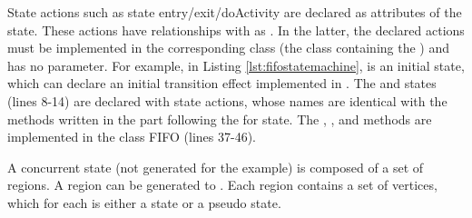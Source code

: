 State actions such as state entry/exit/doActivity are declared as attributes of the state.
These actions have relationships with  as .
In the latter, the declared actions must be implemented in the corresponding class (the class containing the ) and has no parameter.
For example, in Listing \ref{lst:fifostatemachine},  is an initial state, which can declare an initial transition effect implemented in  . 
The  and  states (lines 8-14) are declared with state actions, whose names are identical with the methods written in the  part following the  for state. 
The , , and  methods are implemented in the class FIFO (lines 37-46).


A concurrent state (not generated for the example) is composed of a set of regions.
A region can be generated to  .
Each region contains a set of vertices, which for each is either a state or a pseudo state.



